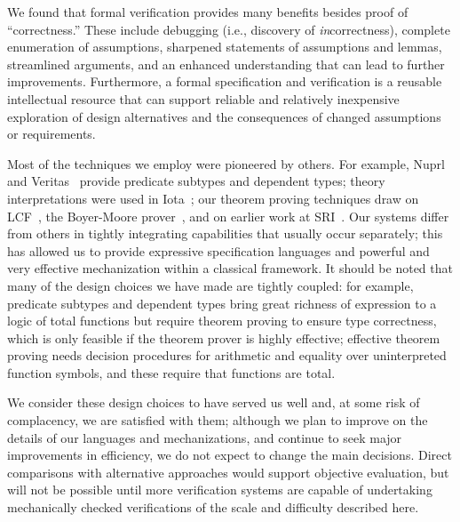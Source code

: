 We found that formal verification provides many benefits besides
proof of ``correctness.''  These include debugging (i.e., discovery
of {\em in\/}correctness), complete enumeration of assumptions,
sharpened statements of assumptions and lemmas, streamlined
arguments, and an enhanced understanding that can lead to further
improvements.  Furthermore, a formal specification and verification
is a reusable intellectual resource that can support reliable and
relatively inexpensive exploration of design alternatives and the
consequences of changed assumptions or requirements.

Most of the techniques we employ were pioneered by others.  For
example, Nuprl~\cite{Nuprl-book} and Veritas~\cite{Hanna89:Veritas}
provide predicate subtypes and dependent types; theory
interpretations were used in Iota~\cite{IOTA}; our theorem proving
techniques draw on LCF~\cite{LCF}, the Boyer-Moore
prover~\cite{Boyer-Moore79,Boyer-Moore88}, and on earlier work at
SRI~\cite{Shostak:combination}.  Our systems differ from others in
tightly integrating capabilities that usually occur separately; this
has allowed us to provide expressive specification languages and
powerful and very effective mechanization within a classical
framework.  It should be noted that many of the design choices we
have made are tightly coupled: for example, predicate subtypes and
dependent types bring great richness of expression to a logic of
total functions but require theorem proving to ensure type
correctness, which is only feasible if the theorem prover is highly
effective; effective theorem proving needs decision procedures for
arithmetic and equality over uninterpreted function symbols, and these
require that functions are total.

We consider these design choices to have served us well and, at some
risk of complacency, we are satisfied with them; although we plan to
improve on the details of our languages and mechanizations, 
and continue to seek major improvements in efficiency, we
do not expect to change the main decisions.  Direct comparisons with
alternative approaches would support objective evaluation, but will
not be possible until more verification systems are capable of
undertaking mechanically checked verifications of the scale and
difficulty described here.
 
